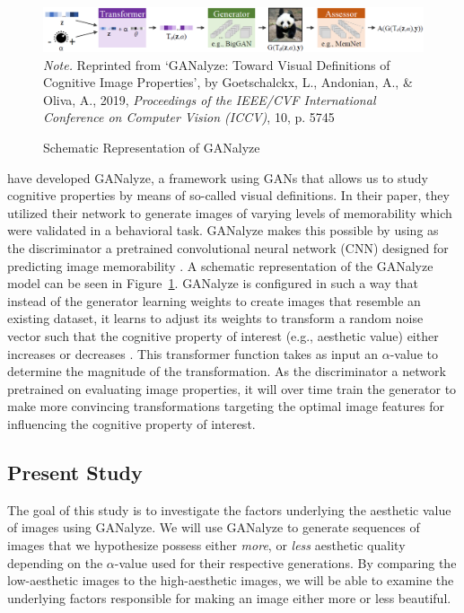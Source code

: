 \documentclass[../main.tex]{subfiles}
\begin{document}

\begin{figure}[!h]
	\caption{Schematic Representation of GANalyze}
	\label{fig:ganalyze}
	\includegraphics[width=1\linewidth]{images/ganalyze}
	{\textit{Note.} Reprinted from `GANalyze: Toward Visual Definitions of Cognitive Image Properties', by Goetschalckx, L., Andonian, A., \& Oliva, A., 2019, \textit{Proceedings of the IEEE/CVF International Conference on Computer Vision (ICCV)}, 10, p. 5745}
\end{figure}

\textcite{goetschalckxGANalyzeVisualDefinitions2019} have developed GANalyze, a framework using GANs that allows us to study cognitive properties by means of so-called visual definitions. In their paper, they utilized their network to generate images of varying levels of memorability which were validated in a behavioral task. GANalyze makes this possible by using as the discriminator a pretrained convolutional neural network (CNN) designed for predicting image memorability \parencite{khosla2015understanding}. A schematic representation of the GANalyze model can be seen in Figure~\ref{fig:ganalyze}. GANalyze is configured in such a way that instead of the generator learning weights to create images that resemble an existing dataset, it learns to adjust its weights to transform a random noise vector such that the cognitive property of interest (e.g., aesthetic value) either increases or decreases \parencite{goetschalckxGANalyzeVisualDefinitions2019}. This transformer function takes as input an $\alpha$-value to determine the magnitude of the transformation. As the discriminator a network pretrained on evaluating image properties, it will over time train the generator to make more convincing transformations targeting the optimal image features for influencing the cognitive property of interest.



\subsection{Present Study}
The goal of this study is to investigate the factors underlying the aesthetic value of images using GANalyze. We will use GANalyze to generate sequences of images that we hypothesize possess either \textit{more}, or \textit{less} aesthetic quality depending on the $\alpha$-value used for their respective generations. By comparing the low-aesthetic images to the high-aesthetic images, we will be able to examine the underlying factors responsible for making an image either more or less beautiful.
\end{document}
